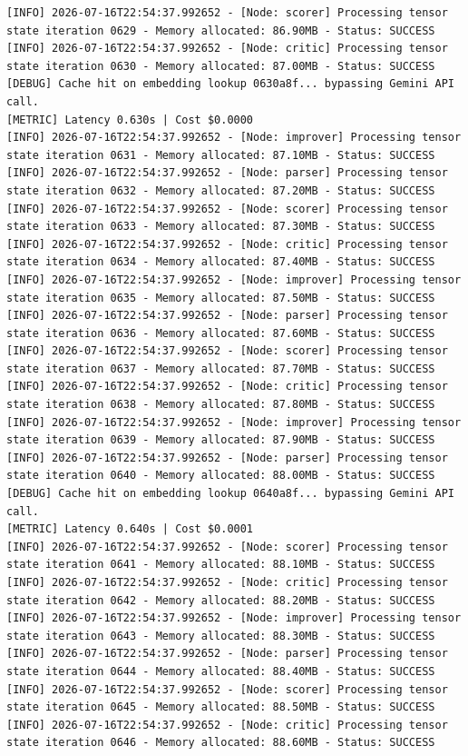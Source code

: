 \documentclass[10pt,journal,compsoc]{IEEEtran}
\begin{document}
\begin{verbatim}
[INFO] 2026-07-16T22:54:37.992652 - [Node: scorer] Processing tensor state iteration 0629 - Memory allocated: 86.90MB - Status: SUCCESS
[INFO] 2026-07-16T22:54:37.992652 - [Node: critic] Processing tensor state iteration 0630 - Memory allocated: 87.00MB - Status: SUCCESS
[DEBUG] Cache hit on embedding lookup 0630a8f... bypassing Gemini API call.
[METRIC] Latency 0.630s | Cost $0.0000
[INFO] 2026-07-16T22:54:37.992652 - [Node: improver] Processing tensor state iteration 0631 - Memory allocated: 87.10MB - Status: SUCCESS
[INFO] 2026-07-16T22:54:37.992652 - [Node: parser] Processing tensor state iteration 0632 - Memory allocated: 87.20MB - Status: SUCCESS
[INFO] 2026-07-16T22:54:37.992652 - [Node: scorer] Processing tensor state iteration 0633 - Memory allocated: 87.30MB - Status: SUCCESS
[INFO] 2026-07-16T22:54:37.992652 - [Node: critic] Processing tensor state iteration 0634 - Memory allocated: 87.40MB - Status: SUCCESS
[INFO] 2026-07-16T22:54:37.992652 - [Node: improver] Processing tensor state iteration 0635 - Memory allocated: 87.50MB - Status: SUCCESS
[INFO] 2026-07-16T22:54:37.992652 - [Node: parser] Processing tensor state iteration 0636 - Memory allocated: 87.60MB - Status: SUCCESS
[INFO] 2026-07-16T22:54:37.992652 - [Node: scorer] Processing tensor state iteration 0637 - Memory allocated: 87.70MB - Status: SUCCESS
[INFO] 2026-07-16T22:54:37.992652 - [Node: critic] Processing tensor state iteration 0638 - Memory allocated: 87.80MB - Status: SUCCESS
[INFO] 2026-07-16T22:54:37.992652 - [Node: improver] Processing tensor state iteration 0639 - Memory allocated: 87.90MB - Status: SUCCESS
[INFO] 2026-07-16T22:54:37.992652 - [Node: parser] Processing tensor state iteration 0640 - Memory allocated: 88.00MB - Status: SUCCESS
[DEBUG] Cache hit on embedding lookup 0640a8f... bypassing Gemini API call.
[METRIC] Latency 0.640s | Cost $0.0001
[INFO] 2026-07-16T22:54:37.992652 - [Node: scorer] Processing tensor state iteration 0641 - Memory allocated: 88.10MB - Status: SUCCESS
[INFO] 2026-07-16T22:54:37.992652 - [Node: critic] Processing tensor state iteration 0642 - Memory allocated: 88.20MB - Status: SUCCESS
[INFO] 2026-07-16T22:54:37.992652 - [Node: improver] Processing tensor state iteration 0643 - Memory allocated: 88.30MB - Status: SUCCESS
[INFO] 2026-07-16T22:54:37.992652 - [Node: parser] Processing tensor state iteration 0644 - Memory allocated: 88.40MB - Status: SUCCESS
[INFO] 2026-07-16T22:54:37.992652 - [Node: scorer] Processing tensor state iteration 0645 - Memory allocated: 88.50MB - Status: SUCCESS
[INFO] 2026-07-16T22:54:37.992652 - [Node: critic] Processing tensor state iteration 0646 - Memory allocated: 88.60MB - Status: SUCCESS

\end{verbatim}
\end{document}
